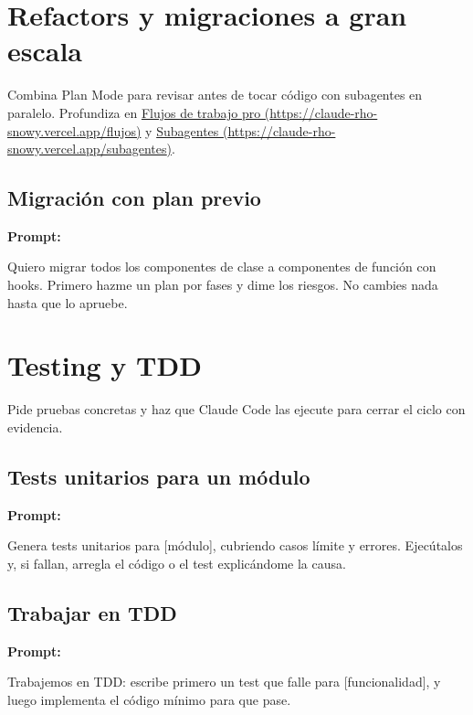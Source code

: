 \documentclass[11pt,a4paper]{report}
\begin{document}
\section{ Refactors y migraciones a gran escala}

Combina Plan Mode para revisar antes de tocar código con subagentes en paralelo. Profundiza en \href{https://claude-rho-snowy.vercel.app/flujos}{Flujos de trabajo pro (\url{https://claude-rho-snowy.vercel.app/flujos})} y \href{https://claude-rho-snowy.vercel.app/subagentes}{Subagentes (\url{https://claude-rho-snowy.vercel.app/subagentes})}.

\subsection{Migración con plan previo}

\noindent\textbf{Prompt: }
\begin{codebox}
Quiero migrar todos los componentes de clase a componentes de función con hooks. Primero hazme un plan por fases y dime los riesgos. No cambies nada hasta que lo apruebe.
\end{codebox}

\section{ Testing y TDD}

Pide pruebas concretas y haz que Claude Code las ejecute para cerrar el ciclo con evidencia.

\subsection{Tests unitarios para un módulo}

\noindent\textbf{Prompt: }
\begin{codebox}
Genera tests unitarios para [módulo], cubriendo casos límite y errores. Ejecútalos y, si fallan, arregla el código o el test explicándome la causa.
\end{codebox}

\subsection{Trabajar en TDD}

\noindent\textbf{Prompt: }
\begin{codebox}
Trabajemos en TDD: escribe primero un test que falle para [funcionalidad], y luego implementa el código mínimo para que pase.
\end{codebox}
\end{document}
